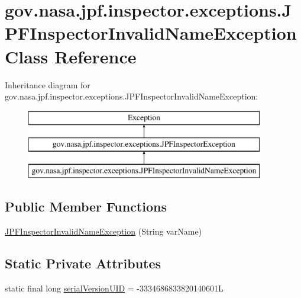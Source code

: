 \hypertarget{classgov_1_1nasa_1_1jpf_1_1inspector_1_1exceptions_1_1_j_p_f_inspector_invalid_name_exception}{}\section{gov.\+nasa.\+jpf.\+inspector.\+exceptions.\+J\+P\+F\+Inspector\+Invalid\+Name\+Exception Class Reference}
\label{classgov_1_1nasa_1_1jpf_1_1inspector_1_1exceptions_1_1_j_p_f_inspector_invalid_name_exception}
Inheritance diagram for gov.\+nasa.\+jpf.\+inspector.\+exceptions.\+J\+P\+F\+Inspector\+Invalid\+Name\+Exception\+:\begin{figure}[H]
\begin{center}
\leavevmode
\includegraphics[height=3.000000cm]{classgov_1_1nasa_1_1jpf_1_1inspector_1_1exceptions_1_1_j_p_f_inspector_invalid_name_exception}
\end{center}
\end{figure}
\subsection*{Public Member Functions}
\begin{DoxyCompactItemize}
\item 
\hyperlink{classgov_1_1nasa_1_1jpf_1_1inspector_1_1exceptions_1_1_j_p_f_inspector_invalid_name_exception_a81ad399bf2f5d3a5c62f07090c05e7bf}{J\+P\+F\+Inspector\+Invalid\+Name\+Exception} (String var\+Name)
\end{DoxyCompactItemize}
\subsection*{Static Private Attributes}
\begin{DoxyCompactItemize}
\item 
static final long \hyperlink{classgov_1_1nasa_1_1jpf_1_1inspector_1_1exceptions_1_1_j_p_f_inspector_invalid_name_exception_a253867bde3fd3f3b3a54a273709c340c}{serial\+Version\+U\+ID} = -\/3334686833820140601L
\end{DoxyCompactItemize}


